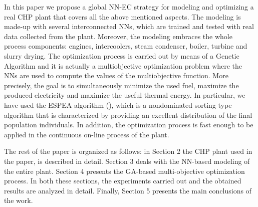 In this paper we propose a global NN-EC strategy for modeling and optimizing a real CHP plant that covers all the above mentioned aspects. The modeling is made-up with several interconnected NNs, which are trained and tested with real data collected from the plant. Moreover, the modeling embraces the whole process components: engines, intercoolers, steam condenser, boiler, turbine and slurry drying. The optimization process is carried out by means of a Genetic Algorithm and it is actually a multiobjective optimization problem where the NNs are used to compute the values of the multiobjective function. More precisely, the goal is to simultaneously minimize the used fuel, maximize the produced electricity and maximize the useful thermal energy. In particular, we have used the ESPEA algorithm (\cite{espea}), which is a nondominated sorting type algorithm that is characterized by providing an excellent distribution of the final population individuals. In addition, the optimization process is fast enough to be applied in the continuous on-line process of the plant.  

The rest of the paper is organized as follows: in Section 2 the CHP plant used in the paper, is described in detail. Section 3 deals with the NN-based modeling of the entire plant. Section 4 presents the GA-based multi-objective optimization process. In both these sections, the experiments carried out and the obtained results are analyzed in detail. Finally, Section 5 presents the main conclusions of the work.
\FloatBarrier